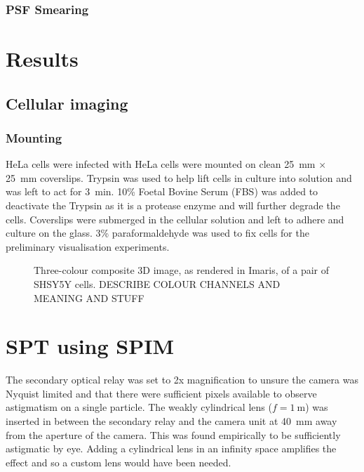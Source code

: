 \subsubsection{PSF Smearing}


\section{Results}

\subsection{Cellular imaging}
\subsubsection{Mounting}
HeLa cells were infected with
HeLa cells were mounted on clean \SI{25}{\milli\metre} $\times$ \SI{25}{\milli\metre} coverslips.
Trypsin was used to help lift cells in culture into solution and was left to act for \SI{3}{\minute}.
10\% Foetal Bovine Serum (FBS) was added to deactivate the Trypsin as it is a protease enzyme and will further degrade the cells.
Coverslips were submerged in the cellular solution and left to adhere and culture on the glass.
3\% paraformaldehyde was used to fix cells for the preliminary visualisation experiments.

\begin{figure}
  \centering
  \caption{Three-colour composite 3D image, as rendered in Imaris, of a pair of SHSY5Y cells.
          DESCRIBE COLOUR CHANNELS AND MEANING AND STUFF}
  \label{}
\end{figure}


\section{SPT using SPIM}

The secondary optical relay was set to 2x magnification to unsure the camera was Nyquist limited and that there were sufficient pixels available to observe astigmatism on a single particle.
The weakly cylindrical lens ($f = \SI{1}{\metre}$) was inserted in between the secondary relay and the camera unit at \SI{40}{\milli\metre} away from the aperture of the camera.
This was found empirically to be sufficiently astigmatic by eye.
Adding a cylindrical lens in an infinity space amplifies the effect and so a custom lens would have been needed.

